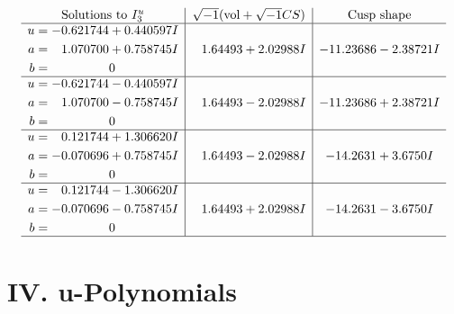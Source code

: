 \documentclass[1p]{elsarticle_modified}
\theoremstyle{definition}
\newcommand{\I}{\sqrt{-1}}
\begin{document}
$$\begin{array}{c|c|c}  
\text{Solutions to }I^u_{3}& \I (\text{vol} + \sqrt{-1}CS) & \text{Cusp shape}\\
 \hline 
\begin{aligned}
u &= -0.621744 + 0.440597 I \\
a &= \phantom{-}1.070700 + 0.758745 I \\
b &= \phantom{-0.000000 } 0\end{aligned}
 & \phantom{-}1.64493 + 2.02988 I & -11.23686 - 2.38721 I \\ \hline\begin{aligned}
u &= -0.621744 - 0.440597 I \\
a &= \phantom{-}1.070700 - 0.758745 I \\
b &= \phantom{-0.000000 } 0\end{aligned}
 & \phantom{-}1.64493 - 2.02988 I & -11.23686 + 2.38721 I \\ \hline\begin{aligned}
u &= \phantom{-}0.121744 + 1.306620 I \\
a &= -0.070696 + 0.758745 I \\
b &= \phantom{-0.000000 } 0\end{aligned}
 & \phantom{-}1.64493 - 2.02988 I & -14.2631 + 3.6750 I \\ \hline\begin{aligned}
u &= \phantom{-}0.121744 - 1.306620 I \\
a &= -0.070696 - 0.758745 I \\
b &= \phantom{-0.000000 } 0\end{aligned}
 & \phantom{-}1.64493 + 2.02988 I & -14.2631 - 3.6750 I\\
 \hline 
 \end{array}$$\newpage
\newpage\renewcommand{\arraystretch}{1}
\centering \section*{ IV. u-Polynomials}
\end{document}

